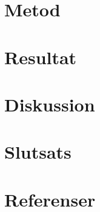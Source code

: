 \documentclass[12pt,swedish]{article}
\begin{document}
    \section{Metod}

    \section{Resultat}

    \section{Diskussion}

    \section{Slutsats}

    \section{Referenser}
    \printbibliography
\end{document}
